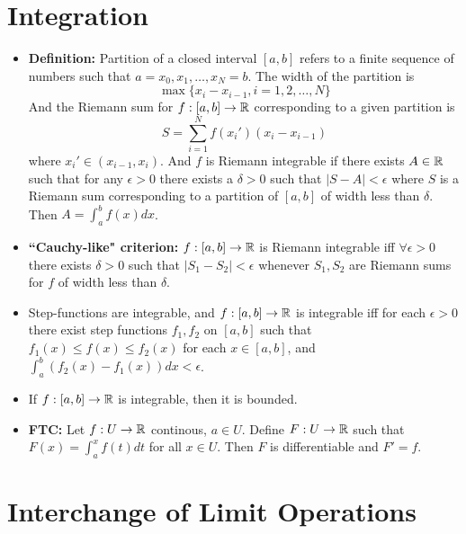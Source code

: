 \documentclass[12pt]{article}
\begin{document}
\section{Integration}

\begin{itemize}
    \item \textbf{Definition:} Partition of a closed interval $[a,b]$ refers to a finite sequence of numbers such that $a = x_0, x_1, \ldots, x_N = b$. The width of the partition is 
    \[\max\{x_i - x_{i-1}, i = 1, 2, \ldots, N\}\]
    And the Riemann sum for $f: [a,b] \to \mathbb R$ corresponding to a given partition is 
    \[S = \sum_{i=1}^Nf(x_i')(x_{i} - x_{i-1})\]
    where $x_i' \in (x_{i-1}, x_i)$.
    And $f$ is Riemann integrable if there exists $A \in \mathbb R$ such that for any $\epsilon >0$ there exists a $\delta>0$ such that $|S-A| < \epsilon$ where $S$ is a Riemann sum corresponding to a partition of $[a,b]$ of width less than $\delta$. Then $A = \int_a^bf(x)dx$. 
    \item \textbf{``Cauchy-like" criterion:} $f: [a,b] \to \mathbb R$ is Riemann integrable iff $\forall \epsilon >0$ there exists $\delta >0$ such that $|S_1 - S_2| < \epsilon$ whenever $S_1, S_2$ are Riemann sums for $f$ of width less than $\delta$.  
    \item Step-functions are integrable, and $f: [a,b] \to \mathbb R$ is integrable iff for each $\epsilon>0$ there exist step functions $f_1, f_2$ on $[a,b]$ such that $f_1(x) \leq f(x) \leq f_2(x)$ for each $x\in [a,b]$, and $\int_a^b(f_2(x) - f_1(x))dx < \epsilon$. 
    \item If $f:[a,b] \to \mathbb R$ is integrable, then it is bounded.
    \item \textbf{FTC:} Let $f: U \to \mathbb R$ continous, $a\in U$. Define $F:U \to \mathbb R$ such that $F(x) = \int_a^xf(t)dt$ for all $x\in U$. Then $F$ is differentiable and $F' = f$.
\end{itemize}

\section{Interchange of Limit Operations}
\end{document}
